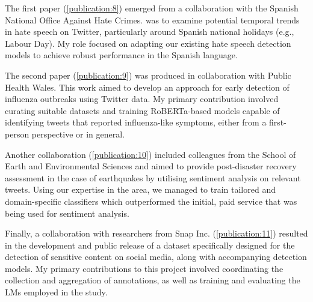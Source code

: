 The first paper (\ref{publication:8}) emerged from a collaboration with the Spanish National Office Against Hate Crimes.  was to examine potential temporal trends in hate speech on Twitter, particularly around Spanish national holidays (e.g., Labour Day). My role focused on adapting our existing hate speech detection models to achieve robust performance in the Spanish language.

The second paper (\ref{publication:9}) was produced in collaboration with Public Health Wales. This work aimed to develop an approach for early detection of influenza outbreaks using Twitter data. My primary contribution involved curating suitable datasets and training RoBERTa-based models capable of identifying tweets that reported influenza-like symptoms, either from a first-person perspective or in general.

Another collaboration (\ref{publication:10}) included colleagues from the School of Earth and Environmental Sciences and aimed to provide post-disaster recovery assessment in the case of earthquakes by utilising sentiment analysis on relevant tweets. Using our expertise in the area, we managed to train tailored and domain-specific classifiers which outperformed the initial, paid service that was being used for sentiment analysis.

Finally, a collaboration with researchers from Snap Inc. (\ref{publication:11}) resulted in the development and public release of a dataset specifically designed for the detection of sensitive content on social media, along with accompanying detection models. My primary contributions to this project involved coordinating the collection and aggregation of annotations, as well as training and evaluating the \acp{LM} employed in the study.

